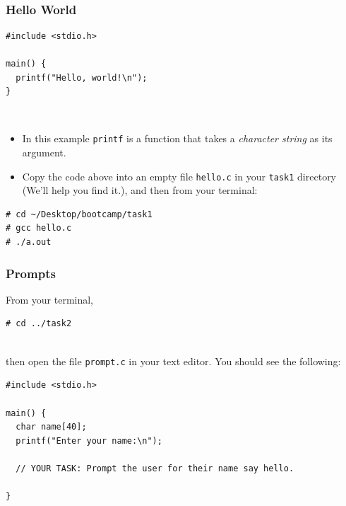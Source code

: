 \documentclass[pdf]{beamer}
\begin{document}
\begin{frame}[fragile]
\\

\end{frame}

\begin{frame}[fragile]
  \frametitle{Hello World}

\begin{verbatim}
#include <stdio.h>

main() {
  printf("Hello, world!\n");
}
\end{verbatim}
\\
  \begin{itemize}
  \item In this example \texttt{printf} is a function that takes a
    \textit{character string} as its argument.
    \pause
  \item Copy the code above into an empty file \texttt{hello.c} in your
    \texttt{task1} directory (We'll help you find it.), and then from your
    terminal:
    \pause
  \end{itemize}
\bigskip
\begin{verbatim}
# cd ~/Desktop/bootcamp/task1
# gcc hello.c
# ./a.out
\end{verbatim}

\end{frame}

\begin{frame}[fragile]
  \frametitle{Prompts}

  From your terminal,
\begin{verbatim}
# cd ../task2
\end{verbatim}
\\
then open the file \texttt{prompt.c} in your text editor. You should
see the following:

\pause

\bigskip

\begin{verbatim}
#include <stdio.h>

main() {
  char name[40];
  printf("Enter your name:\n");

  // YOUR TASK: Prompt the user for their name say hello.

}
\end{verbatim}

\end{frame}
\end{document}
